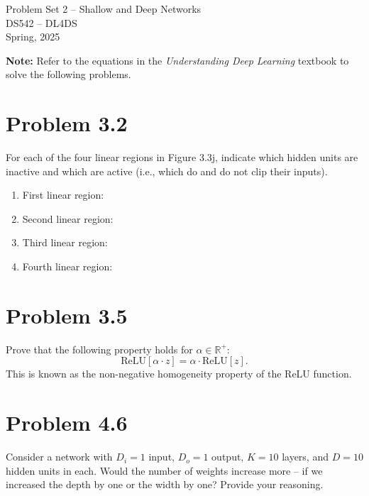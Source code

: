 \documentclass[10pt]{article}
\begin{document}
\begin{center}
    \LARGE {Problem Set 2 – Shallow and Deep Networks} \\[1em]
    \Large{DS542 – DL4DS} \\[0.5em]
    \large Spring, 2025
\end{center}

\vspace{2em}

\noindent\textbf{Note:} Refer to the equations in the \textit{Understanding Deep Learning} textbook to solve the following problems.

\vspace{2em}

\section*{Problem 3.2}
For each of the four linear regions in Figure 3.3j, indicate which hidden units are inactive and which are active (i.e., which do and do not clip their inputs).
\begin{enumerate}
    \item First linear region:
    \item Second linear region:
    \item Third linear region: 
    \item Fourth linear region: 
\end{enumerate}
\vspace{2em}

\section*{Problem 3.5}

Prove that the following property holds for $\alpha \in \mathbb{R}^+$:
\[
\text{ReLU}[\alpha \cdot z] = \alpha \cdot \text{ReLU}[z].
\]
This is known as the non-negative homogeneity property of the ReLU function.

\vspace{2em}

\section*{Problem 4.6}

Consider a network with $D_i = 1$ input, $D_o = 1$ output, $K = 10$ layers, and $D = 10$ hidden units in each. Would the number of weights increase more -- if we increased the depth by one or the width by one? Provide your reasoning.
\end{document}
